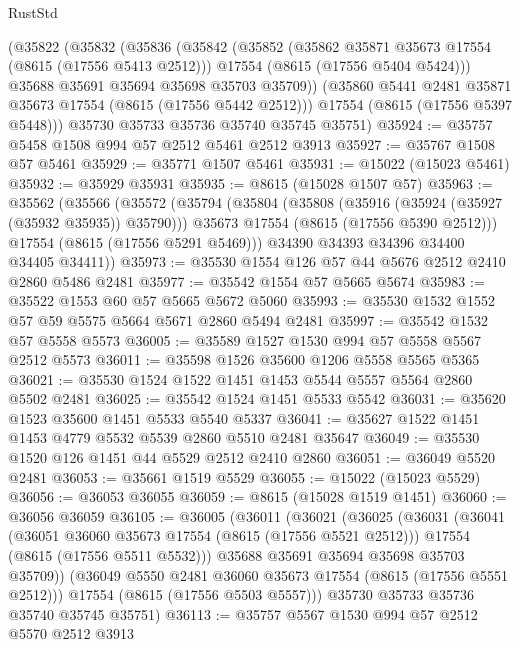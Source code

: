 \begin{lexlean}{RustStd}
\begin{coremodule}
    (@35822
      (@35832
        (@35836
          (@35842
            (@35852
              (@35862 @35871 @35673 @17554 (@8615 (@17556 @5413 @2512)))
              @17554
              (@8615 (@17556 @5404 @5424)))
            @35688
            @35691
            @35694
            @35698
            @35703
            @35709))
        (@35860 @5441 @2481 @35871 @35673 @17554 (@8615 (@17556 @5442 @2512)))
        @17554
        (@8615 (@17556 @5397 @5448)))
      @35730
      @35733
      @35736
      @35740
      @35745
      @35751)
@35924 := @35757 @5458 @1508 @994 @57 @2512 @5461 @2512 @3913
@35927 := @35767 @1508 @57 @5461
@35929 := @35771 @1507 @5461
@35931 := @15022 (@15023 @5461)
@35932 := @35929 @35931
@35935 := @8615 (@15028 @1507 @57)
@35963 := @35562
    (@35566
      (@35572
        (@35794
          (@35804
            (@35808 (@35916 (@35924 (@35927 (@35932 @35935)) @35790)))
            @35673
            @17554
            (@8615 (@17556 @5390 @2512)))
          @17554
          (@8615 (@17556 @5291 @5469)))
        @34390
        @34393
        @34396
        @34400
        @34405
        @34411))
@35973 := @35530 @1554 @126 @57 @44 @5676 @2512 @2410 @2860 @5486 @2481
@35977 := @35542 @1554 @57 @5665 @5674
@35983 := @35522 @1553 @60 @57 @5665 @5672 @5060
@35993 := @35530 @1532 @1552 @57 @59 @5575 @5664 @5671 @2860 @5494 @2481
@35997 := @35542 @1532 @57 @5558 @5573
@36005 := @35589 @1527 @1530 @994 @57 @5558 @5567 @2512 @5573
@36011 := @35598 @1526 @35600 @1206 @5558 @5565 @5365
@36021 := @35530 @1524 @1522 @1451 @1453 @5544 @5557 @5564 @2860 @5502 @2481
@36025 := @35542 @1524 @1451 @5533 @5542
@36031 := @35620 @1523 @35600 @1451 @5533 @5540 @5337
@36041 := @35627 @1522 @1451 @1453 @4779 @5532 @5539 @2860 @5510 @2481 @35647
@36049 := @35530 @1520 @126 @1451 @44 @5529 @2512 @2410 @2860
@36051 := @36049 @5520 @2481
@36053 := @35661 @1519 @5529
@36055 := @15022 (@15023 @5529)
@36056 := @36053 @36055
@36059 := @8615 (@15028 @1519 @1451)
@36060 := @36056 @36059
@36105 := @36005
    (@36011
      (@36021
        (@36025
          (@36031
            (@36041
              (@36051 @36060 @35673 @17554 (@8615 (@17556 @5521 @2512)))
              @17554
              (@8615 (@17556 @5511 @5532)))
            @35688
            @35691
            @35694
            @35698
            @35703
            @35709))
        (@36049 @5550 @2481 @36060 @35673 @17554 (@8615 (@17556 @5551 @2512)))
        @17554
        (@8615 (@17556 @5503 @5557)))
      @35730
      @35733
      @35736
      @35740
      @35745
      @35751)
@36113 := @35757 @5567 @1530 @994 @57 @2512 @5570 @2512 @3913

\end{coremodule}
\end{lexlean}
